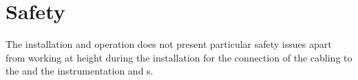 




\section{Safety}
\label{sec:fddp-crp-safety}

The  installation and operation does not present particular safety issues apart from working at height during the  installation for the connection of the cabling to the  and the instrumentation and  \fdth{}s.











